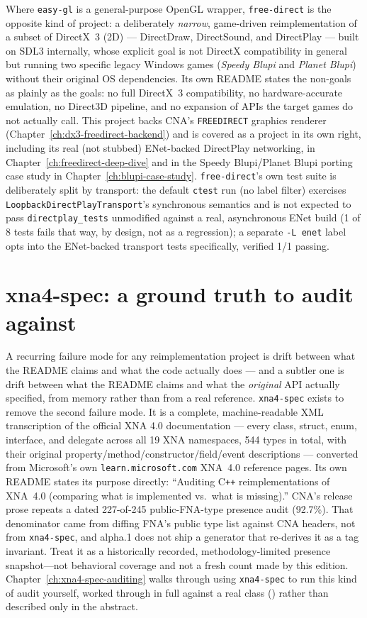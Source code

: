 Where \texttt{easy-gl} is a general-purpose OpenGL wrapper, \texttt{free-direct} is the
opposite kind of project: a deliberately \emph{narrow}, game-driven reimplementation of a
subset of DirectX~3 (2D) --- DirectDraw, DirectSound, and DirectPlay --- built on SDL3
internally, whose explicit goal is not DirectX compatibility in general but running two
specific legacy Windows games (\emph{Speedy Blupi} and \emph{Planet Blupi}) without their
original OS dependencies. Its own README states the non-goals as plainly as the goals: no
full DirectX~3 compatibility, no hardware-accurate emulation, no Direct3D pipeline, and no
expansion of APIs the target games do not actually call. This project backs CNA's
\texttt{FREEDIRECT} graphics renderer (Chapter~\ref{ch:dx3-freedirect-backend}) and is covered as a
project in its own right, including its real (not stubbed) ENet-backed DirectPlay networking,
in Chapter~\ref{ch:freedirect-deep-dive} and in the Speedy Blupi/Planet Blupi porting case study
in Chapter~\ref{ch:blupi-case-study}. \texttt{free-direct}'s own test suite is deliberately split
by transport: the default \texttt{ctest} run (no label filter) exercises
\texttt{LoopbackDirectPlayTransport}'s synchronous semantics and is not expected to pass
\texttt{directplay\_tests} unmodified against a real, asynchronous ENet build (1 of 8 tests fails
that way, by design, not as a regression); a separate \texttt{-L enet} label opts into the
ENet-backed transport tests specifically, verified 1/1 passing.

\section{xna4-spec: a ground truth to audit against}

A recurring failure mode for any reimplementation project is drift between what the README
claims and what the code actually does --- and a subtler one is drift between what the
README claims and what the \emph{original} API actually specified, from memory rather than
from a real reference. \texttt{xna4-spec} exists to remove the second failure mode. It is a
complete, machine-readable XML transcription of the official XNA 4.0 documentation --- every
class, struct, enum, interface, and delegate across all 19 XNA namespaces, 544 types in
total, with their original property/method/constructor/field/event descriptions --- converted
from Microsoft's own \texttt{learn.microsoft.com} XNA~4.0 reference pages. Its own README
states its purpose directly: ``Auditing C\texttt{++} reimplementations of XNA~4.0 (comparing
what is implemented vs.\ what is missing).'' CNA's release prose repeats a dated
227-of-245 public-FNA-type presence audit (92.7\%). That denominator came from diffing FNA's
public type list against CNA headers, not from \texttt{xna4-spec}, and alpha.1 does not ship a
generator that re-derives it as a tag invariant. Treat it as a historically recorded,
methodology-limited presence snapshot---not behavioral coverage and not a fresh count made by
this edition.
Chapter~\ref{ch:xna4-spec-auditing} walks through using \texttt{xna4-spec} to run this kind of
audit yourself, worked through in full against a real class () rather than
described only in the abstract.

